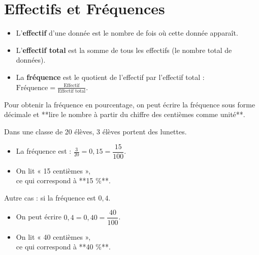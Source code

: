 \documentclass[a4paper]{book}
\begin{document}
    
\section{Effectifs et Fréquences}
    
    \begin{definition}
        \begin{itemize}
            \item L'\textbf{effectif} d'une donnée est le nombre de fois où cette donnée apparaît. 
            \item L'\textbf{effectif total} est la somme de tous les effectifs (le nombre total de données). 
            \item La \textbf{fréquence} est le quotient de l'effectif par l'effectif total : $ \text{Fréquence} = \frac{\text{Effectif}}{\text{Effectif total}} $. 
        \end{itemize}
    \end{definition}
    
    
    \begin{methode}
        Pour obtenir la fréquence en pourcentage, on peut écrire la fréquence sous forme décimale et **lire le nombre à partir du chiffre des centièmes comme unité**.
    \end{methode}
    
    
    \begin{exemple}
        \begin{minipage}{0.45\linewidth}
            Dans une classe de 20 élèves, 3 élèves portent des lunettes.
            \begin{itemize}
                \item La fréquence est : $\frac{3}{20} = 0,15 = \dfrac{15}{100}$. 
                \item On lit « 15 centièmes », \\
                \text{ } \hfill ce qui correspond à **15 \%**.
            \end{itemize}
        \end{minipage}
        \hfill \vline \hfill
        \begin{minipage}{0.45\linewidth}
            Autre cas : si la fréquence est $0,4$.
            \begin{itemize}
                \item On peut écrire $0,4 = 0,40 = \dfrac{40}{100}$.
                \item On lit « 40 centièmes », \\
                \text{ } \hfill ce qui correspond à **40 \%**.
            \end{itemize}
        \end{minipage}
    \end{exemple}
    
\end{document}
